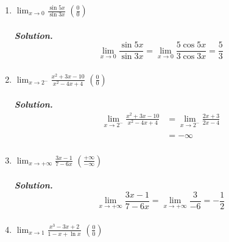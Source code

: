 \documentclass[
  letterpaper,
  DIV=11,
  numbers=noendperiod]{scrartcl}
\let\oldsubparagraph\subparagraph
\renewcommand{\subparagraph}[1]{\oldsubparagraph{#1}\mbox{}}
\theoremstyle{plain}
\theoremstyle{remark}
\begin{document}
\begin{enumerate}
\def\labelenumi{\arabic{enumi}.}
\setcounter{enumi}{1}
\item
  \(\displaystyle\lim_{x \to 0} \frac{\sin5x}{\sin3x}\)
  \(\left(\frac{0}{0}\right)\)

  \hypertarget{solution.-displaystylelim_x-to-0-fracsin5xsin3xdisplaystylelim_x-to-0-frac5cos5x3cos3xfrac53}{%
  \subparagraph{\texorpdfstring{\emph{Solution}. \[
  \displaystyle\lim_{x \to 0} \frac{\sin5x}{\sin3x}=\displaystyle\lim_{x \to 0} \frac{5\cos5x}{3\cos3x}=\frac{5}{3}
  \]}{Solution. 
  \textbackslash displaystyle\textbackslash lim\_\{x \textbackslash to 0\} \textbackslash frac\{\textbackslash sin5x\}\{\textbackslash sin3x\}=\textbackslash displaystyle\textbackslash lim\_\{x \textbackslash to 0\} \textbackslash frac\{5\textbackslash cos5x\}\{3\textbackslash cos3x\}=\textbackslash frac\{5\}\{3\}
  }}\label{solution.-displaystylelim_x-to-0-fracsin5xsin3xdisplaystylelim_x-to-0-frac5cos5x3cos3xfrac53}}
\item
  \(\displaystyle\lim_{x \to 2^-} \frac{x^2+3x-10}{x^2-4x+4}\)
  \(\left(\frac{0}{0}\right)\)

  \hypertarget{solution.-beginaligned-displaystylelim_x-to-2--fracx23x-10x2-4x4displaystylelim_x-to-2-frac2x32x-4-infty-endaligned}{%
  \subparagraph{\texorpdfstring{\emph{Solution}. \[
  \begin{aligned}
  \displaystyle\lim_{x \to 2^-} \frac{x^2+3x-10}{x^2-4x+4}&=\displaystyle\lim_{x \to 2^-}\frac{2x+3}{2x-4}\\&\\&=-\infty
  \end{aligned}
  \]}{Solution. 
  \textbackslash begin\{aligned\}
  \textbackslash displaystyle\textbackslash lim\_\{x \textbackslash to 2\^{}-\} \textbackslash frac\{x\^{}2+3x-10\}\{x\^{}2-4x+4\}\&=\textbackslash displaystyle\textbackslash lim\_\{x \textbackslash to 2\^{}-\}\textbackslash frac\{2x+3\}\{2x-4\}\textbackslash\textbackslash\&\textbackslash\textbackslash\&=-\textbackslash infty
  \textbackslash end\{aligned\}
  }}\label{solution.-beginaligned-displaystylelim_x-to-2--fracx23x-10x2-4x4displaystylelim_x-to-2-frac2x32x-4-infty-endaligned}}
\item
  \(\displaystyle\lim_{x \to +\infty}\frac{3x-1}{7-6x}\)
  \(\left(\frac{+\infty}{-\infty}\right)\)

  \hypertarget{solution.-displaystylelim_x-to-inftyfrac3x-17-6xdisplaystylelim_x-to-infty-frac3-6-frac12}{%
  \subparagraph{\texorpdfstring{\emph{Solution}. \[
  \displaystyle\lim_{x \to +\infty}\frac{3x-1}{7-6x}=\displaystyle\lim_{x \to +\infty} \frac{3}{-6}=-\frac{1}{2}
  \]}{Solution. 
  \textbackslash displaystyle\textbackslash lim\_\{x \textbackslash to +\textbackslash infty\}\textbackslash frac\{3x-1\}\{7-6x\}=\textbackslash displaystyle\textbackslash lim\_\{x \textbackslash to +\textbackslash infty\} \textbackslash frac\{3\}\{-6\}=-\textbackslash frac\{1\}\{2\}
  }}\label{solution.-displaystylelim_x-to-inftyfrac3x-17-6xdisplaystylelim_x-to-infty-frac3-6-frac12}}
\item
  \(\displaystyle\lim_{x \to 1} \frac{x^3-3x+2}{1-x+\ln x}\)
  \(\left(\frac{0}{0}\right)\)


\end{enumerate}
\end{document}
